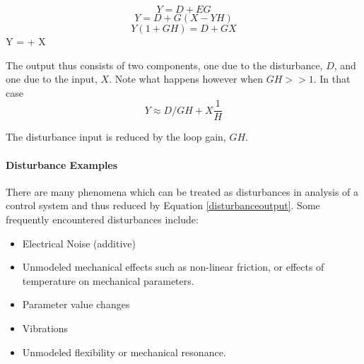 \[
Y = D + EG
\]
\[
Y = D+ G(X-YH)
\]
\[
Y(1+GH) = D+GX
\]
\bq\label{disturbanceoutput}
Y =  +  X
\eq

 The output thus consists of two components, one due to the disturbance, $D$, and one due to the input, $X$.   Note what happens however when $GH>>1$. In that case
 \[
 Y \approx D/GH + X \frac{1}{H}
 \]

The disturbance input is reduced by the loop gain, $GH$.

\paragraph{Disturbance Examples}

There are many phenomena which can be treated as disturbances in analysis of a control system and thus reduced by Equation \ref{disturbanceoutput}.
Some frequently encountered disturbances include:


\begin{itemize}
  \item Electrical Noise (additive)
  \item Unmodeled mechanical effects such as non-linear friction, or effects of temperature on mechanical parameters.
  \item Parameter value changes
  \item Vibrations
  \item Unmodeled flexibility or mechanical resonance.
\end{itemize}



